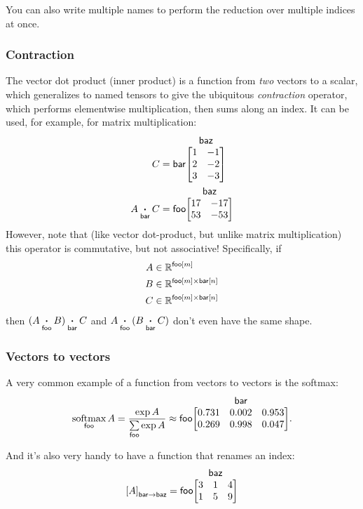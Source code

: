 \documentclass{article}
\makeatletter
\newcommand{\nmatrix}[3]{\name{#1}\begin{array}[b]{@{}c@{}}\name{#2}\\\begin{bmatrix}#3\end{bmatrix}\end{array}}
\makeatother
\begin{document}
You can also write multiple names to perform the reduction over multiple indices at once.

\subsubsection{Contraction}

The vector dot product (inner product) is a function from \emph{two} vectors to a scalar, which generalizes to named tensors to give the ubiquitous \emph{contraction} operator, which performs elementwise multiplication, then sums along an index. It can be used, for example, for matrix multiplication:
\begin{align*}
C &= \nmatrix{bar}{baz}{
  1 & -1 \\ 2 & -2 \\ 3 & -3
} \\
A \ndot{bar} C &= \nmatrix{foo}{baz}{
  17 & -17 \\
  53 & -53
}
\end{align*}
However, note that (like vector dot-product, but unlike matrix multiplication) this operator is commutative, but not associative! Specifically, if
\begin{align*}
A &\in \mathbb{R}^{\mathsf{foo}[m]} \\
B &\in \mathbb{R}^{\mathsf{foo}[m] \times\mathsf{bar}[n]} \\
C &\in \mathbb{R}^{\mathsf{foo}[m] \times\mathsf{bar}[n]}
\end{align*}
then $(A \mathbin{\mathop{\boldsymbol\cdot}\limits_{\mathsf{foo}}} B) \mathbin{\mathop{\boldsymbol\cdot}\limits_{\mathsf{bar}}} C$ and $A \mathbin{\mathop{\boldsymbol\cdot}\limits_{\mathsf{foo}}} (B \mathbin{\mathop{\boldsymbol\cdot}\limits_{\mathsf{bar}}} C)$ don't even have the same shape.

\subsubsection{Vectors to vectors}

A very common example of a function from vectors to vectors is the softmax:
\begin{equation*}
  \nfun{foo}{softmax} A = \frac{\exp A}{\nsum{foo} \exp A} \approx \nmatrix{foo}{bar}{
    0.731 & 0.002 & 0.953 \\
    0.269 & 0.998 & 0.047
  }.
\end{equation*}

And it's also very handy to have a function that renames an index:
\begin{equation*}
\nmov{bar}{baz}{A} = \nmatrix{foo}{baz}{
  3 & 1 & 4 \\
  1 & 5 & 9
}
\end{equation*}
\end{document}
